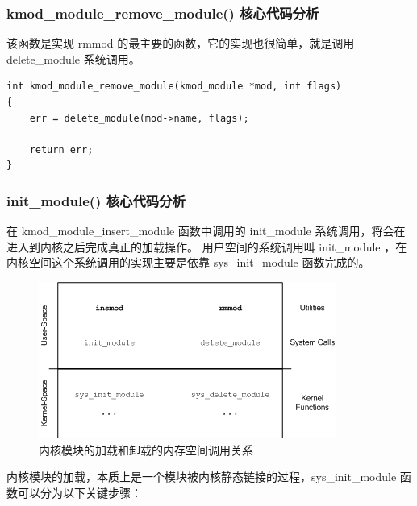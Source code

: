 \documentclass[11pt,a4paper]{article}
\makeatletter
\def\maxwidth{\ifdim\Gin@nat@width>\linewidth\linewidth
\else\Gin@nat@width\fi}
\let\Oldincludegraphics\includegraphics
\renewcommand{\includegraphics}[1]{\Oldincludegraphics[width=\maxwidth]{#1}}
\makeatother
\begin{document}
\subsubsection{kmod\_module\_remove\_module() 核心代码分析}

该函数是实现 rmmod 的最主要的函数，它的实现也很简单，就是调用
delete\_module 系统调用。

{\begin{shaded}\begin{verbatim}
int kmod_module_remove_module(kmod_module *mod, int flags)
{
    err = delete_module(mod->name, flags);

    return err;
}
\end{verbatim}\end{shaded}}
\subsubsection{init\_module() 核心代码分析}

在 kmod\_module\_insert\_module 函数中调用的 init\_module
系统调用，将会在进入到内核之后完成真正的加载操作。 用户空间的系统调用叫
init\_module ，在内核空间这个系统调用的实现主要是依靠 sys\_init\_module
函数完成的。

\begin{figure}[htbp]
\centering
\includegraphics{./figures/user_sys_module.jpg}
\caption{内核模块的加载和卸载的内存空间调用关系}
\end{figure}

内核模块的加载，本质上是一个模块被内核静态链接的过程，sys\_init\_module
函数可以分为以下关键步骤：
\end{document}
